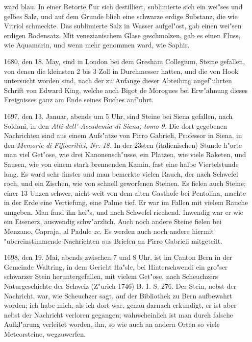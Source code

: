 \documentclass[a4paper, 11pt, oneside, polutonikogreek, german]{article}
\begin{document}
ward blau. In einer Retorte f"ur sich destilliert, sublimierte sich ein wei"ses und gelbes Salz, und auf dem Grunde blieb eine schwarze erdige Substanz, die wie Vitriol schmeckte. Das sublimierte Salz in Wasser aufgel"ost, gab einen wei"sen erdigen Bodensatz. Mit venezianischem Glase geschmolzen, gab es einen Fluss, wie Aquamarin, und wenn mehr genommen ward, wie Saphir.

1680, den 18. May, sind in London bei dem Gresham Collegium, Steine gefallen, von denen die kleinsten 2 bis 3 Zoll in Durchmesser hatten, und die von Hook untersucht worden sind, nach der zu Anfange dieser Abteilung angef"uhrten Schrift von Edward King, welche auch Bigot de Morogues bei Erw"ahnung dieses Ereignisses ganz am Ende seines Buches anf"uhrt.

1697, den 13. Januar, abends um 5 Uhr, sind Steine bei Siena gefallen, nach Soldani, in den \emph{Atti dell' Accademia di Siena, tomo 9.} Die dort gegebenen Nachrichten sind aus einem Aufs"atze von Pirro Gabrieli, Professor in Siena, in den \emph{Memorie di Fifiocritici, Nr. 18.} In der 23sten (italienischen) Stunde h"orte man viel Get"ose, wie drei Kanonensch"usse, ein Platzen, wie viele Raketen, und Sausen, wie von einem stark brennenden Kamin, fast eine halbe Viertelstunde lang. Es ward sehr finster und man bemerkte vielen Rauch, der nach Schwefel roch, und ein Zischen, wie von schnell geworfenen Steinen. Es fielen auch Steine; einer 13 Unzen schwer, nicht weit von dem alten Gasthofe bei Pentolina, machte in der Erde eine Vertiefung, eine Palme tief. Er war im Fallen mit vielem Rauche umgeben. Man fand ihn hei"s, und nach Schwefel riechend. Inwendig war er wie ein Eisenerz, auswendig schw"arzlich. Auch noch andere Steine fielen bei Menzano, Capraja, al Padule \emph{zc.} Es werden auch noch andere hiermit "ubereinstimmende Nachrichten aus Briefen an Pirro Gabrieli mitgeteilt.

1698, den 19. Mai, abends zwischen 7 und 8 Uhr, ist im Canton Bern in der Gemeinde Waltring, in dem Gericht Ha"sle, bei Hinterschwendi ein gro"ser schwarzer Stein heruntergefallen, mit vielem Get"ose, nach Scheuchzers Naturgeschichte der Schweiz (Z"urich 1746) B. 1. S. 276. Der Stein, nebst der Nachricht, war, wie Scheuchzer sagt, auf der Bibliothek zu Bern aufbewahrt worden; ich habe mich, als ich dort war, genau darnach erkundigt, er ist aber nebst der Nachricht verloren gegangen; wahrscheinlich ist man durch falsche Aufkl"arung verleitet worden, ihn, so wie auch an andern Orten so viele Meteorsteine, wegzuwerfen.
\end{document}
